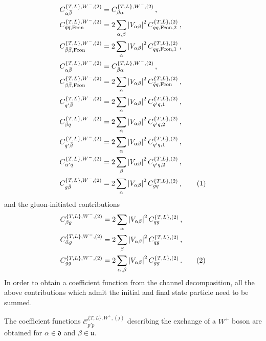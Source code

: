 \documentclass[11pt,a4paper]{article}
\newcommand{\Ccal}{\mathcal{C}}
\newcommand{\qb}{\bar{q}}
\newcommand{\qp}{{q^\prime}}
\newcommand{\qbp}{{\bar{q}^\prime}}
\newcommand\numberthis{\addtocounter{equation}{1}\tag{\theequation}}
\newcommand{\Fcon}{\mathrm{Fcon}}
\begin{document}
 \begin{align*}
C^{\{T,L\},W^-,(2)}_{\bar{\alpha}\bar{\beta}} & = C^{\{T,L\},W^-,(2)}_{\beta\alpha}  \,  , \\
C^{\{T,L\},W^-,(2)}_{\bar{q}\bar{q},\Fcon} &= 2\sum_{\alpha,\beta}  \left|V_{\alpha\beta} \right|^2  C^{\{T,L\},(2)}_{qq, \Fcon, 2}   \,  , \\
C^{\{T,L\},W^-,(2)}_{\bar{\beta}\bar{\beta},\Fcon} &= 2\sum_\alpha \left|V_{\alpha\beta} \right|^2 C^{\{T,L\},(2)}_{qq, \Fcon, 1}  \,  , \\
C^{\{T,L\},W^-,(2)}_{\alpha\bar{\beta}} & = C^{\{T,L\},W^-,(2)}_{\bar{\beta} \alpha} \,  , \\
C^{\{T,L\},W^-,(2)}_{\beta\bar{\beta}, \Fcon} &= 2\sum_\alpha \left|V_{\alpha\beta} \right|^2 C^{\{T,L\},(2)}_{\qb q, \Fcon}  \,  , \\
C^{\{T,L\},W^-,(2)}_{\qp \bar{\beta}} & = 2\sum_\alpha \left|V_{\alpha\beta}\right|^2 C^{\{T,L\},(2)}_{\qp q, 1}  \,  , \\
C^{\{T,L\},W^-,(2)}_{\beta \bar{q}} & =  2\sum_\alpha \left|V_{\alpha\beta}\right|^2 C^{\{T,L\},(2)}_{\qp q, 2} \,  , \\
C^{\{T,L\},W^-,(2)}_{\qbp \bar{\beta}} & = 2\sum_\alpha \left|V_{\alpha\beta}\right|^2  C^{\{T,L\},(2)}_{\qp q, 1}  \,  , \\
C^{\{T,L\},W^-,(2)}_{\bar{\alpha}' \bar{q}} & = 2\sum_\beta \left|V_{\alpha\beta}\right|^2 C^{\{T,L\},(2)}_{\qp q, 2} \,  , \\
C^{\{T,L\},W^-,(2)}_{g\bar{\beta}} &=  2\sum_\alpha \left|V_{\alpha\beta}\right|^2 C^{\{T,L\},(2)}_{gq} \,  , \numberthis
\end{align*}
and the gluon-initiated contributions
\begin{align*}
C^{\{T,L\},W^-,(2)}_{\beta g} &= 2\sum_\alpha \left|V_{\alpha\beta}\right|^2 C^{\{T,L\},(2)}_{qg}  \, ,  \\
C^{\{T,L\},W^-,(2)}_{\bar{\alpha}g} &= 2\sum_\beta \left|V_{\alpha\beta}\right|^2 C^{\{T,L\},(2)}_{qg} \, ,  \\
C^{\{T,L\},W^-,(2)}_{gg} &= 2\sum_{\alpha,\beta} \left|V_{\alpha\beta}\right|^2 C^{\{T,L\},(2)}_{gg} \, . \numberthis
\end{align*}
In order to obtain a coefficient function from the channel decomposition, all the above contributions which admit the initial and final state particle need to be summed.

The coefficient functions $\Ccal^{\{T,L\},W^+,(j)}_{p'p}$ describing the exchange of a $W^+$ boson are obtained for $\alpha\in \mathfrak{d}$ and $\beta\in \mathfrak{u}$.
\end{document}
